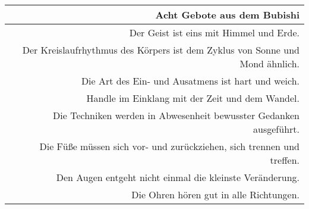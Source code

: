 \begin{tcolorbox}[colframe=lightgray,colback=white,coltitle=black,title=Allgemeines:\indent Grundsätze und D\={o}j\={o}kun nach Miyagi Chojun]
\begin{footnotesize}
		\begin{tabularx}{\textwidth}{Xr}	
			\hfill & \textbf{Acht Gebote aus dem Bubishi}\\
			\midrule
			\hfill & Der Geist ist eins mit Himmel und Erde. \\
			\hfill & Der Kreislaufrhythmus des Körpers ist dem Zyklus von Sonne und Mond ähnlich. \\
			\hfill & Die Art des Ein- und Ausatmens ist hart und weich. \\
			\hfill & Handle im Einklang mit der Zeit und dem Wandel. \\
			\hfill & Die Techniken werden in Abwesenheit bewusster Gedanken ausgeführt. \\
			\hfill & Die Füße müssen sich vor- und zurückziehen, sich trennen und treffen. \\
			\hfill & Den Augen entgeht nicht einmal die kleinste Veränderung. \\
			\hfill & Die Ohren hören gut in alle Richtungen. \\
		\end{tabularx}
	\end{footnotesize}
\end{tcolorbox}
\clearpage
\pagebreak
